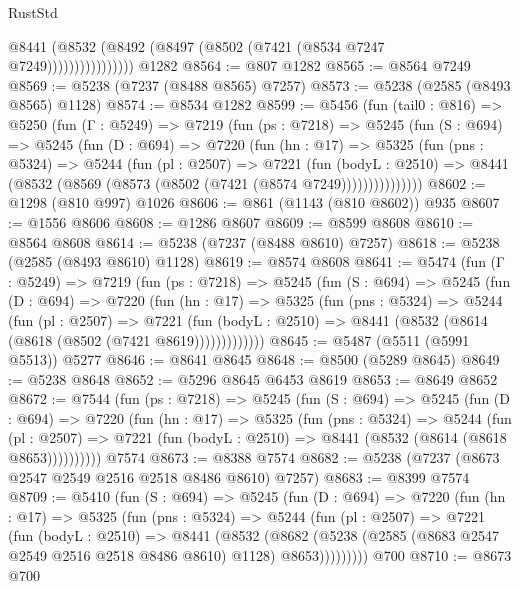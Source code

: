 \begin{lexlean}{RustStd}
\begin{coremodule}
                      @8441 (@8532 (@8492 (@8497 (@8502 (@7421 (@8534 @7247 @7249))))))))))))))))
    @1282
@8564 := @807 @1282
@8565 := @8564 @7249
@8569 := @5238 (@7237 (@8488 @8565) @7257)
@8573 := @5238 (@2585 (@8493 @8565) @1128)
@8574 := @8534 @1282
@8599 := @5456
    (fun (tail0 : @816) =>
    @5250
      (fun (Γ : @5249) =>
      @7219
        (fun (ps : @7218) =>
        @5245
          (fun (S : @694) =>
          @5245
            (fun (D : @694) =>
            @7220
              (fun (hn : @17) =>
              @5325
                (fun (pns : @5324) =>
                @5244
                  (fun (pl : @2507) =>
                  @7221
                    (fun (bodyL : @2510) =>
                    @8441 (@8532 (@8569 (@8573 (@8502 (@7421 (@8574 @7249)))))))))))))))
@8602 := @1298 (@810 @997) @1026
@8606 := @861 (@1143 (@810 @8602)) @935
@8607 := @1556 @8606
@8608 := @1286 @8607
@8609 := @8599 @8608
@8610 := @8564 @8608
@8614 := @5238 (@7237 (@8488 @8610) @7257)
@8618 := @5238 (@2585 (@8493 @8610) @1128)
@8619 := @8574 @8608
@8641 := @5474
    (fun (Γ : @5249) =>
    @7219
      (fun (ps : @7218) =>
      @5245
        (fun (S : @694) =>
        @5245
          (fun (D : @694) =>
          @7220
            (fun (hn : @17) =>
            @5325
              (fun (pns : @5324) =>
              @5244
                (fun (pl : @2507) =>
                @7221
                  (fun (bodyL : @2510) =>
                  @8441 (@8532 (@8614 (@8618 (@8502 (@7421 @8619)))))))))))))
@8645 := @5487 (@5511 (@5991 @5513)) @5277
@8646 := @8641 @8645
@8648 := @8500 (@5289 @8645)
@8649 := @5238 @8648
@8652 := @5296 @8645 @6453 @8619
@8653 := @8649 @8652
@8672 := @7544
    (fun (ps : @7218) =>
    @5245
      (fun (S : @694) =>
      @5245
        (fun (D : @694) =>
        @7220
          (fun (hn : @17) =>
          @5325
            (fun (pns : @5324) =>
            @5244
              (fun (pl : @2507) =>
              @7221 (fun (bodyL : @2510) => @8441 (@8532 (@8614 (@8618 @8653))))))))))
    @7574
@8673 := @8388 @7574
@8682 := @5238 (@7237 (@8673 @2547 @2549 @2516 @2518 @8486 @8610) @7257)
@8683 := @8399 @7574
@8709 := @5410
    (fun (S : @694) =>
    @5245
      (fun (D : @694) =>
      @7220
        (fun (hn : @17) =>
        @5325
          (fun (pns : @5324) =>
          @5244
            (fun (pl : @2507) =>
            @7221
              (fun (bodyL : @2510) =>
              @8441
                (@8532
                  (@8682
                    (@5238 (@2585 (@8683 @2547 @2549 @2516 @2518 @8486 @8610) @1128) @8653)))))))))
    @700
@8710 := @8673 @700

\end{coremodule}
\end{lexlean}
